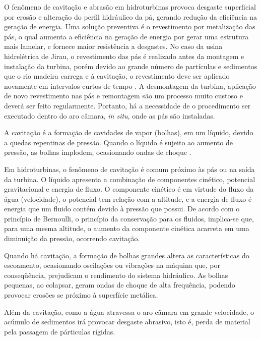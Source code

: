O fenômeno de cavitação e abrasão em hidroturbinas provoca desgaste
superficial por erosão e alteração do perfil
hidráulico da pá, gerando redução da eficiência na geração de energia.
Uma solução preventiva é o revestimento por metalização das pás, o qual aumenta a eficiência na
geração de energia por gerar uma estrutura mais lamelar, e fornece maior
resistência a desgastes. No caso da usina hidrelétrica de Jirau, o revestimento
das pás é realizado antes da montagem e instalação da turbina, porém devido ao grande número de
partículas e sedimentos que o rio madeira carrega e à cavitação, o revestimento
deve ser aplicado novamente em intervalos curtos de tempo
\citep{santa2009slurry}. A desmontagem da turbina, aplicação de novo
revestimento nas pás e remontagem são um processo muito custoso e deverá ser
feito regularmente. Portanto, há a necessidade de o procedimento ser
executado dentro do aro câmara, \textit{in situ}, onde as pás são instaladas.

A cavitação é a formação de cavidades de vapor (bolhas), em um líquido, devido a
quedas repentinas de pressão. Quando o líquido é sujeito ao aumento de pressão,
as bolhas implodem, ocasionando ondas de choque \citep{brennen2013cavitation}.

Em hidroturbinas, o fenômeno de cavitação é comum próximo às pás ou
na saída da turbina. O líquido apresenta a combinação
de componentes cinético, potencial gra\-vitacional e energia de fluxo. O
componente cinético é em virtude do fluxo da água (velocidade), o potencial tem
relação com a altitude, e a energia de fluxo é energia que um fluido contém
devido à pressão que possui. De acordo com o princípio de Bernoulli, o princípio
da conservação para os fluidos, implica-se que, para uma mesma altitude, o
aumento da componente cinética acarreta em uma diminuição da pressão, ocorrendo
cavitação. 

Quando há cavitação, a formação de bolhas grandes altera as características do
escoamento, ocasionando oscilações ou vibrações na máquina que, por
conseqüência, prejudicam o rendimento do sistema hidráulico. As bolhas
pequenas, ao colapsar, geram ondas de choque de alta frequência, podendo provocar erosões se
próximo à superfície metálica.

Além da cavitação, como a água atravessa o aro câmara em grande velocidade, o
acúmulo de sedimentos irá provocar desgaste abrasivo, isto é, perda de material
pela passagem de párticulas rígidas. 

